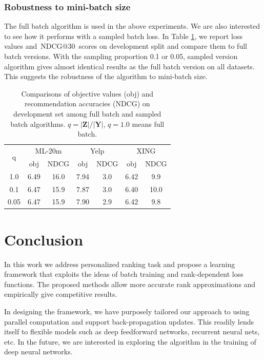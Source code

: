 \documentclass[letterpaper]{article} %
\makeatletter
\newcommand{\ndcg}{{\textsc{NDCG@30}}}
\newcommand{\xing}{\textsf{XING}}
\newcommand{\yelp}{\textsf{Yelp}}
\newcommand{\movietwenty}{\textsf{ML-20m}}
\makeatother
\begin{document}
\subsubsection{Robustness to mini-batch size}

The full batch algorithm is used in the above experiments. We are also interested to see how it performs with a sampled batch loss. In Table \ref{t:sampled}, we report loss values and~\ndcg~scores on development split and compare them to full batch versions. With the sampling proportion 0.1 or 0.05, sampled version algorithm gives almost identical results as the full batch version on all datasets. This suggests the robustness of the algorithm to mini-batch size.

\begin{table}
\centering
\begin{tabular} { |c|| c | c | c | c| c|c|} \hline
 \multirow{ 2}{*}{q}	         & \multicolumn{2}{|c|}{\movietwenty}  & \multicolumn{2}{|c|}{\yelp} & \multicolumn{2}{|c|}{\xing}  \\ \cline{2-7}
                  &  obj & \small{NDCG} & obj & \small{NDCG} & obj & \small{NDCG} \\ \hline
1.0    & 6.49 & 16.0  & 7.94 & 3.0   &  6.42  & 9.9\\ \hline
0.1  & 6.47 & 15.9    & 7.87  & 3.0  & 6.40  & 10.0 \\ \hline
0.05    & 6.47 & 15.9    & 7.90   &2.9  & 6.42  & 9.8\\ \hline
\end{tabular}
\caption{Comparisons of objective values (obj) and recommendation accuracies (NDCG) on development set among full batch and sampled batch algorithms. $q=|\textbf{Z}|/|\textbf{Y}|$, $q=1.0$ means full batch.} \label{t:sampled}
\end{table}

\section{Conclusion}

In this work we address personalized ranking task and propose a learning framework that exploits the ideas of batch training and rank-dependent loss functions. The proposed methods allow more accurate rank approximations and empirically give competitive results.

In designing the framework, we have purposely tailored our approach to using parallel computation and support back-propagation updates. This readily lends itself to flexible models such as deep feedforward networks, recurrent neural nets, etc. In the future, we are interested in exploring the algorithm in the training of deep neural networks.

\label{sec:summary}

\clearpage


\end{document}
